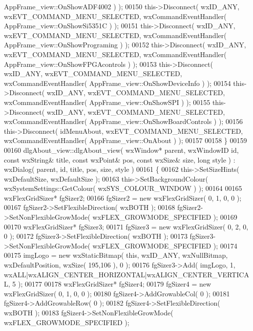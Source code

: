 \begin{DoxyCode}
      AppFrame_view::OnShowADF4002 ) );
00150     this->Disconnect( wxID\_ANY, wxEVT\_COMMAND\_MENU\_SELECTED, wxCommandEventHandler( 
      AppFrame_view::OnShowSi5351C ) );
00151     this->Disconnect( wxID\_ANY, wxEVT\_COMMAND\_MENU\_SELECTED, wxCommandEventHandler( 
      AppFrame_view::OnShowPrograming ) );
00152     this->Disconnect( wxID\_ANY, wxEVT\_COMMAND\_MENU\_SELECTED, wxCommandEventHandler( 
      AppFrame_view::OnShowFPGAcontrols ) );
00153     this->Disconnect( wxID\_ANY, wxEVT\_COMMAND\_MENU\_SELECTED, wxCommandEventHandler( 
      AppFrame_view::OnShowDeviceInfo ) );
00154     this->Disconnect( wxID\_ANY, wxEVT\_COMMAND\_MENU\_SELECTED, wxCommandEventHandler( 
      AppFrame_view::OnShowSPI ) );
00155     this->Disconnect( wxID\_ANY, wxEVT\_COMMAND\_MENU\_SELECTED, wxCommandEventHandler( 
      AppFrame_view::OnShowBoardControls ) );
00156     this->Disconnect( idMenuAbout, wxEVT\_COMMAND\_MENU\_SELECTED, wxCommandEventHandler( 
      AppFrame_view::OnAbout ) );
00157     
00158 \}
00159 
00160 dlgAbout_view::dlgAbout_view( wxWindow* parent, wxWindowID \textcolor{keywordtype}{id}, \textcolor{keyword}{const} wxString& title, \textcolor{keyword}{const} wxPoint& pos, \textcolor{keyword}{
      const} wxSize& size, \textcolor{keywordtype}{long} style ) : wxDialog( parent, id, title, pos, size, style )
00161 \{
00162     this->SetSizeHints( wxDefaultSize, wxDefaultSize );
00163     this->SetBackgroundColour( wxSystemSettings::GetColour( wxSYS\_COLOUR\_WINDOW ) );
00164     
00165     wxFlexGridSizer* fgSizer2;
00166     fgSizer2 = \textcolor{keyword}{new} wxFlexGridSizer( 0, 1, 0, 0 );
00167     fgSizer2->SetFlexibleDirection( wxBOTH );
00168     fgSizer2->SetNonFlexibleGrowMode( wxFLEX\_GROWMODE\_SPECIFIED );
00169     
00170     wxFlexGridSizer* fgSizer3;
00171     fgSizer3 = \textcolor{keyword}{new} wxFlexGridSizer( 0, 2, 0, 0 );
00172     fgSizer3->SetFlexibleDirection( wxBOTH );
00173     fgSizer3->SetNonFlexibleGrowMode( wxFLEX\_GROWMODE\_SPECIFIED );
00174     
00175     imgLogo = \textcolor{keyword}{new} wxStaticBitmap( \textcolor{keyword}{this}, wxID\_ANY, wxNullBitmap, wxDefaultPosition, wxSize( 195,106 ), 0 );
00176     fgSizer3->Add( imgLogo, 1, wxALL|wxALIGN\_CENTER\_HORIZONTAL|wxALIGN\_CENTER\_VERTICAL, 5 );
00177     
00178     wxFlexGridSizer* fgSizer4;
00179     fgSizer4 = \textcolor{keyword}{new} wxFlexGridSizer( 0, 1, 0, 0 );
00180     fgSizer4->AddGrowableCol( 0 );
00181     fgSizer4->AddGrowableRow( 0 );
00182     fgSizer4->SetFlexibleDirection( wxBOTH );
00183     fgSizer4->SetNonFlexibleGrowMode( wxFLEX\_GROWMODE\_SPECIFIED );

\end{DoxyCode}
